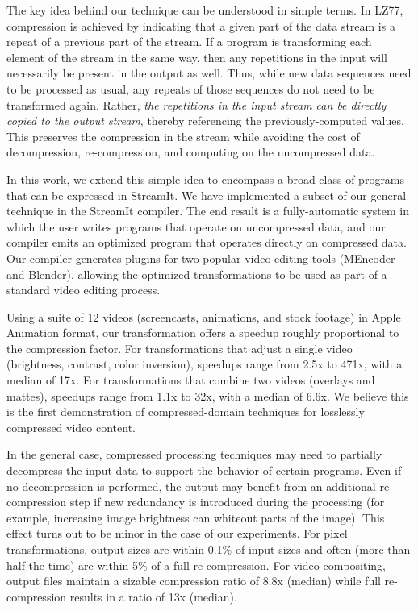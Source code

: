 The key idea behind our technique can be understood in simple terms.
In LZ77, compression is achieved by indicating that a given part of
the data stream is a repeat of a previous part of the stream.  If a
program is transforming each element of the stream in the same way,
then any repetitions in the input will necessarily be present in the
output as well.  Thus, while new data sequences need to be processed
as usual, any repeats of those sequences do not need to be transformed
again.  Rather, {\it the repetitions in the input stream can be
  directly copied to the output stream}, thereby referencing the
previously-computed values.  This preserves the compression in the
stream while avoiding the cost of decompression, re-compression, and
computing on the uncompressed data.  


In this work, we extend this simple idea to encompass a broad class of
programs that can be expressed in StreamIt.  We have implemented a
subset of our general technique in the StreamIt compiler.  The end
result is a fully-automatic system in which the user writes programs
that operate on uncompressed data, and our compiler emits an optimized
program that operates directly on compressed data.  Our compiler
generates plugins for two popular video editing tools (MEncoder and
Blender), allowing the optimized transformations to be used as part of
a standard video editing process.

Using a suite of 12 videos (screencasts, animations, and stock
footage) in Apple Animation format, our transformation offers a
speedup roughly proportional to the compression factor.  For
transformations that adjust a single video (brightness, contrast,
color inversion), speedups range from 2.5x to 471x, with a median of
17x.  For transformations that combine two videos (overlays and
mattes), speedups range from 1.1x to 32x, with a median of 6.6x.  We
believe this is the first demonstration of compressed-domain
techniques for losslessly compressed video content.

In the general case, compressed processing techniques may need to
partially decompress the input data to support the behavior of certain
programs.  Even if no decompression is performed, the output may
benefit from an additional re-compression step if new redundancy is
introduced during the processing (for example, increasing image
brightness can whiteout parts of the image).  This effect turns out to
be minor in the case of our experiments.  For pixel transformations,
output sizes are within 0.1\% of input sizes and often (more than half
the time) are within 5\% of a full re-compression.  For video
compositing, output files maintain a sizable compression ratio of 8.8x
(median) while full re-compression results in a ratio of 13x (median).

